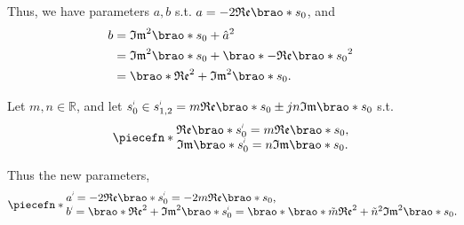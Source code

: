 \documentclass[12pt]{article}
\DeclarePairedDelimiter\brao()%
\DeclarePairedDelimiter\piecefn\{.
\newcommand{\setprime}[2][1]{%
    {#2}^{%
        \raisebox{1pt}{%
            \scalebox{0.5}{%
                \itshape\sffamily\uppercase%
                \expandafter{%
                    \romannumeral#1%
                }%
            }%
        }
    }%
}%
\begin{document}
\begin{enumerate}[(a)]
        Thus, we have parameters $a,b$ s.t. $a = -2 \mathfrak{Re}\brao*{s_0}$, and
        \begin{equation}
            \begin{aligned}
                b &{}= \mathfrak{Im}^2\brao*{s_0} + \hat{a}^2
            \\*
                & {}= \mathfrak{Im}^2\brao*{s_0} + \brao*{-\mathfrak{Re}\brao*{s_0}}^2
            \\*
                & {}= \brao*{\mathfrak{Re}^2 + \mathfrak{Im}^2}\brao*{s_0}.
            \\*
            \end{aligned}
        \end{equation}

        Let $m,n \in \mathbb{R}$, and let $\setprime{s}_0 \in \setprime{s}_{1,2} = m\mathfrak{Re}\brao*{s_0} \pm jn\mathfrak{Im}\brao*{s_0}$ s.t.
        \begin{equation}
            \piecefn*{
                \begin{matrix}
                    \mathfrak{Re}\brao*{\setprime{s}_0} = m\mathfrak{Re}\brao*{s_0},
                \\*
                    \mathfrak{Im}\brao*{\setprime{s}_0} = n\mathfrak{Im}\brao*{s_0}.
                \\*
                \end{matrix}
            }
        \end{equation}

        Thus the new parameters,
        \begin{equation}
            \piecefn*{
                \begin{array}{@{}l@{}}\displaystyle
                      \setprime{a}
                    = -2\mathfrak{Re}\brao*{\setprime{s}_0}
                    = -2m\mathfrak{Re}\brao*{s_0}
                    \rlap,
                \\*
                      \setprime{b}
                    = \brao*{\mathfrak{Re}^2 + \mathfrak{Im}^2}\brao*{\setprime{s}_0}
                    = \brao*{\brao*{\tilde{m}\mathfrak{Re}}^2 + \tilde{n}^2\mathfrak{Im}^2}\brao*{s_0}
                    \rlap.
                \\*
                \end{array}
            }
        \end{equation}


\end{enumerate}
\end{document}
